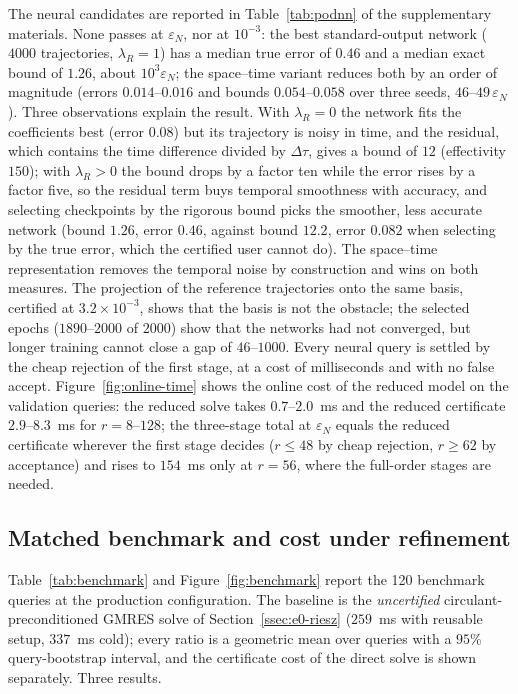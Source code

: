 \documentclass[hidelinks]{siamart251216}
\newcommand{\dt}{\Delta\tau}
\begin{document}
The neural candidates are reported in Table~\ref{tab:podnn} of the supplementary materials.  None passes at $\varepsilon_N$, nor
at $10^{-3}$: the best standard-output network ($4000$ trajectories, $\lambda_R=1$) has a median true
error of $0.46$ and a median exact bound of $1.26$, about $10^3\varepsilon_N$; the space--time
variant reduces both by an order of magnitude (errors $0.014$--$0.016$ and bounds $0.054$--$0.058$ over three seeds,
$46$--$49\,\varepsilon_N$).  Three observations explain the result.  With $\lambda_R=0$ the network
fits the coefficients best (error $0.08$) but its trajectory is noisy in time, and the residual,
which contains the time difference divided by $\dt$, gives a bound of $12$ (effectivity $150$);
with $\lambda_R>0$ the bound drops by a factor ten while the error rises by a factor five, so the
residual term buys temporal smoothness with accuracy, and selecting checkpoints by the rigorous
bound picks the smoother, less accurate network (bound $1.26$, error $0.46$, against bound $12.2$,
error $0.082$ when selecting by the true error, which the certified user cannot do).  The
space--time representation removes the temporal noise by construction and wins on both measures.
The projection of the reference trajectories onto the same basis, certified at
$3.2\times10^{-3}$, shows that the basis is not the obstacle; the selected epochs ($1890$--$2000$ of
$2000$) show that the networks had not converged, but longer training cannot close a gap of
$46$--$1000$.  Every neural query is settled by the cheap rejection of the first stage, at a cost of
milliseconds and with no false accept.  Figure~\ref{fig:online-time} shows the online cost of the
reduced model on the validation queries: the reduced solve takes $0.7$--$2.0$~ms and the reduced
certificate $2.9$--$8.3$~ms for $r=8$--$128$; the three-stage total at $\varepsilon_N$ equals the
reduced certificate wherever the first stage decides ($r\le48$ by cheap rejection, $r\ge62$ by
acceptance) and rises to $154$~ms only at $r=56$, where the full-order stages are needed.
\subsection{Matched benchmark and cost under refinement}
\label{ssec:benchmark}\label{ssec:scaling-results}
Table~\ref{tab:benchmark} and Figure~\ref{fig:benchmark} report the 120 benchmark queries at the
production configuration.  The baseline is the \emph{uncertified} circulant-preconditioned GMRES
solve of Section~\ref{ssec:e0-riesz} ($259$~ms with reusable setup, $337$~ms cold); every ratio is a
geometric mean over queries with a $95\%$ query-bootstrap interval, and the certificate cost of the
direct solve is shown separately.  Three results.
\end{document}
